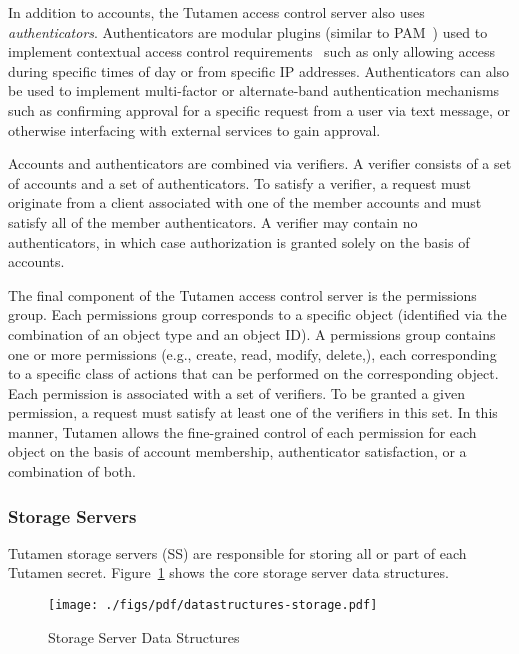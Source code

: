 In addition to accounts, the Tutamen access control server also uses
\textit{authenticators}. Authenticators are modular plugins (similar
to PAM~\cite{samar1996}) used to implement contextual access control
requirements~\cite{hulsebosch2005} such as only allowing access during
specific times of day or from specific IP addresses. Authenticators
can also be used to implement multi-factor or alternate-band
authentication mechanisms such as confirming approval for a specific
request from a user via text message, or otherwise interfacing with
external services to gain approval.

Accounts and authenticators are combined via verifiers. A verifier
consists of a set of accounts and a set of authenticators. To satisfy
a verifier, a request must originate from a client associated with one
of the member accounts and must satisfy all of the member
authenticators. A verifier may contain no authenticators, in which
case authorization is granted solely on the basis of accounts.

The final component of the Tutamen access control server is the
permissions group. Each permissions group corresponds to a specific
object (identified via the combination of an object type and an object
ID). A permissions group contains one or more permissions (e.g.,
create, read, modify, delete,), each corresponding to a specific class
of actions that can be performed on the corresponding object. Each
permission is associated with a set of verifiers. To be granted a
given permission, a request must satisfy at least one of the verifiers
in this set. In this manner, Tutamen allows the fine-grained control
of each permission for each object on the basis of account membership,
authenticator satisfaction, or a combination of both.

\subsubsection{Storage Servers}
\label{sec:tutamen:arch:ss}

Tutamen storage servers (SS) are responsible for storing all or part
of each Tutamen secret. Figure~\ref{fig:tutamen:storagestructs} shows
the core storage server data structures.

\begin{figure}[th]
  \centering
  \texttt{[image: ./figs/pdf/datastructures-storage.pdf]}
  \caption{Storage Server Data Structures}
  \label{fig:tutamen:storagestructs}
\end{figure}

